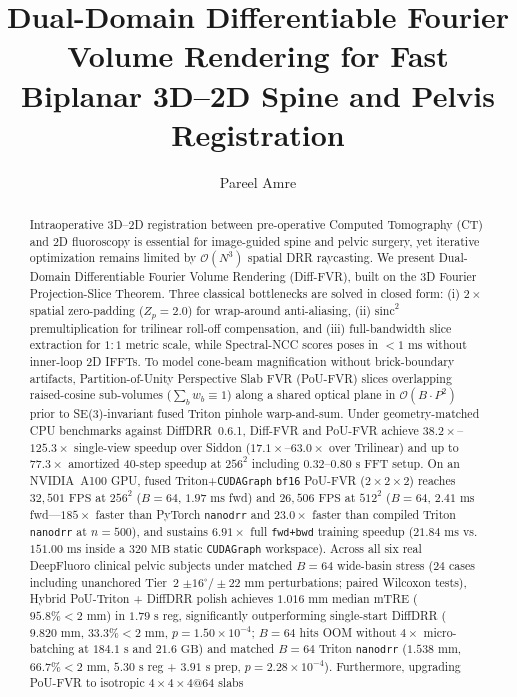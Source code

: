 \documentclass[review,12pt]{elsarticle}
\begin{document}
\begin{frontmatter}

\title{Dual-Domain Differentiable Fourier Volume Rendering for Fast Biplanar 3D--2D Spine and Pelvis Registration}

\author[tud]{Pareel Amre}

\begin{abstract}
Intraoperative 3D--2D registration between pre-operative Computed Tomography (CT) and 2D fluoroscopy is essential for image-guided spine and pelvic surgery, yet iterative optimization remains limited by $\mathcal{O}(N^3)$ spatial DRR raycasting. We present Dual-Domain Differentiable Fourier Volume Rendering (Diff-FVR), built on the 3D Fourier Projection-Slice Theorem. Three classical bottlenecks are solved in closed form: (i) $2\times$ spatial zero-padding ($Z_p=2.0$) for wrap-around anti-aliasing, (ii) $\mathrm{sinc}^2$ premultiplication for trilinear roll-off compensation, and (iii) full-bandwidth slice extraction for $1:1$ metric scale, while Spectral-NCC scores poses in $<1\text{ ms}$ without inner-loop 2D IFFTs. To model cone-beam magnification without brick-boundary artifacts, Partition-of-Unity Perspective Slab FVR (PoU-FVR) slices overlapping raised-cosine sub-volumes ($\sum_b w_b \equiv 1$) along a shared optical plane in $\mathcal{O}(B \cdot P^2)$ prior to SE(3)-invariant fused Triton pinhole warp-and-sum. Under geometry-matched CPU benchmarks against DiffDRR~0.6.1, Diff-FVR and PoU-FVR achieve $38.2\times$--$125.3\times$ single-view speedup over Siddon ($17.1\times$--$63.0\times$ over Trilinear) and up to $77.3\times$ amortized 40-step speedup at $256^2$ including $0.32$--$0.80\text{ s}$ FFT setup. On an NVIDIA~A100 GPU, fused Triton+\texttt{CUDAGraph} \texttt{bf16} PoU-FVR ($2\times 2\times 2$) reaches $32{,}501\text{ FPS}$ at $256^2$ ($B{=}64$, $1.97\text{ ms}$ fwd) and $26{,}506\text{ FPS}$ at $512^2$ ($B{=}64$, $2.41\text{ ms}$ fwd---$185\times$ faster than PyTorch \texttt{nanodrr} and $23.0\times$ faster than compiled Triton \texttt{nanodrr} at $n{=}500$), and sustains $6.91\times$ full \texttt{fwd+bwd} training speedup ($21.84\text{ ms}$ vs.\ $151.00\text{ ms}$ inside a $320\text{ MB}$ static \texttt{CUDAGraph} workspace). Across all six real DeepFluoro clinical pelvic subjects under matched $B{=}64$ wide-basin stress ($24$ cases including unanchored Tier~2 $\pm 16^\circ/\pm 22\text{ mm}$ perturbations; paired Wilcoxon tests), Hybrid PoU-Triton + DiffDRR polish achieves $1.016\text{ mm}$ median mTRE ($95.8\% <2\text{ mm}$) in $1.79\text{ s}$ reg, significantly outperforming single-start DiffDRR ($9.820\text{ mm}$, $33.3\% <2\text{ mm}$, $p=1.50\times 10^{-4}$; $B{=}64$ hits OOM without $4\times$ micro-batching at $184.1\text{ s}$ and $21.6\text{ GB}$) and matched $B{=}64$ Triton \texttt{nanodrr} ($1.538\text{ mm}$, $66.7\% <2\text{ mm}$, $5.30\text{ s}$ reg + $3.91\text{ s}$ prep, $p=2.28\times 10^{-4}$). Furthermore, upgrading PoU-FVR to isotropic $4{\times}4{\times}4@64$ slabs 
\end{abstract}
\end{frontmatter}
\end{document}
